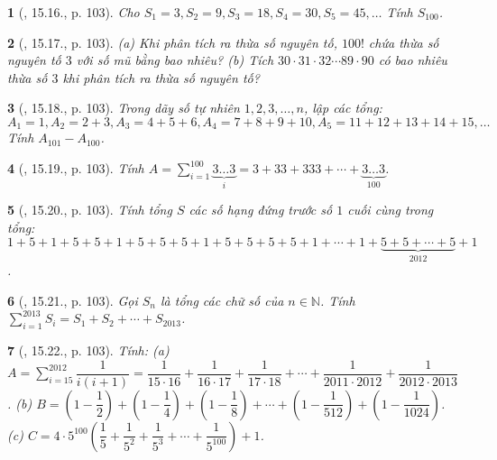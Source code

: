\documentclass{article}
\newtheorem{baitoan}{}
\begin{document}
\begin{baitoan}[\cite{TLCT_THCS_Toan_6_so_hoc}, 15.16., p. 103]
	Cho $S_1 = 3,S_2 = 9,S_3 = 18,S_4 = 30,S_5 = 45,\ldots$ Tính $S_{100}$.
\end{baitoan}

\begin{baitoan}[\cite{TLCT_THCS_Toan_6_so_hoc}, 15.17., p. 103]
	(a) Khi phân tích ra thừa số nguyên tố, $100!$ chứa thừa số nguyên tố $3$ với số mũ bằng bao nhiêu? (b) Tích $30\cdot31\cdot32\cdots89\cdot90$ có bao nhiêu thừa số $3$ khi phân tích ra thừa số nguyên tố?
\end{baitoan}

\begin{baitoan}[\cite{TLCT_THCS_Toan_6_so_hoc}, 15.18., p. 103]
	Trong dãy số tự nhiên $1,2,3,\ldots,n$, lập các tổng: $A_1 = 1,A_2 = 2 + 3,A_3 = 4 + 5 + 6,A_4 = 7 + 8 + 9 +10,A_5 = 11 + 12 + 13 + 14 + 15,\ldots$ Tính $A_{101} - A_{100}$.
\end{baitoan}

\begin{baitoan}[\cite{TLCT_THCS_Toan_6_so_hoc}, 15.19., p. 103]
	Tính $A = \sum_{i=1}^{100} \underbrace{3\ldots3}_i = 3 + 33 + 333 + \cdots + \underbrace{3\ldots3}_{100}$.
\end{baitoan}

\begin{baitoan}[\cite{TLCT_THCS_Toan_6_so_hoc}, 15.20., p. 103]
	Tính tổng $S$ các số hạng đứng trước số $1$ cuối cùng trong tổng: $1 + 5 + 1 + 5 + 5 + 1 + 5 + 5 + 5 + 1 + 5 + 5 + 5 + 5 + 1 + \cdots + 1 + \underbrace{5 + 5 + \cdots + 5}_{2012} + 1$.
\end{baitoan}

\begin{baitoan}[\cite{TLCT_THCS_Toan_6_so_hoc}, 15.21., p. 103]
	Gọi $S_n$ là tổng các chữ số của $n\in\mathbb{N}$. Tính $\sum_{i=1}^{2013} S_i = S_1 + S_2 + \cdots + S_{2013}$.
\end{baitoan}

\begin{baitoan}[\cite{TLCT_THCS_Toan_6_so_hoc}, 15.22., p. 103]
	Tính: (a) $A = \sum_{i=15}^{2012} \dfrac{1}{i(i + 1)} = \dfrac{1}{15\cdot16} + \dfrac{1}{16\cdot17} + \dfrac{1}{17\cdot18} + \cdots + \dfrac{1}{2011\cdot2012} + \dfrac{1}{2012\cdot2013}$. (b) $B = \left(1 - \dfrac{1}{2}\right) + \left(1 - \dfrac{1}{4}\right) + \left(1 - \dfrac{1}{8}\right) + \cdots + \left(1 - \dfrac{1}{512}\right) + \left(1 - \dfrac{1}{1024}\right)$. (c) $C = 4\cdot5^{100}\left(\dfrac{1}{5} + \dfrac{1}{5^2} + \dfrac{1}{5^3} + \cdots + \dfrac{1}{5^{100}}\right) + 1$.
\end{baitoan}
\end{document}
